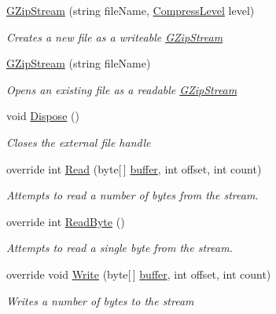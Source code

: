 \begin{DoxyCompactItemize}
\item 
\hyperlink{class_dot_z_lib_1_1_g_zip_stream_a12d73ef46491a5023b1fd620efb13f1a}{G\+Zip\+Stream} (string file\+Name, \hyperlink{namespace_dot_z_lib_a034f7a1ef9856d8834e6f6b1c53d8a4c}{Compress\+Level} level)
\begin{DoxyCompactList}\small\item\em Creates a new file as a writeable \hyperlink{class_dot_z_lib_1_1_g_zip_stream}{G\+Zip\+Stream} \end{DoxyCompactList}\item 
\hyperlink{class_dot_z_lib_1_1_g_zip_stream_aea152a18b8cab1ee3d614fc3799c7e08}{G\+Zip\+Stream} (string file\+Name)
\begin{DoxyCompactList}\small\item\em Opens an existing file as a readable \hyperlink{class_dot_z_lib_1_1_g_zip_stream}{G\+Zip\+Stream} \end{DoxyCompactList}\item 
void \hyperlink{class_dot_z_lib_1_1_g_zip_stream_a1fab7340250fa883c12ab08502826d07}{Dispose} ()
\begin{DoxyCompactList}\small\item\em Closes the external file handle \end{DoxyCompactList}\item 
override int \hyperlink{class_dot_z_lib_1_1_g_zip_stream_a7f08839f681ed2eec9e3a87a0f1b0b0b}{Read} (byte\mbox{[}$\,$\mbox{]} \hyperlink{structbuffer}{buffer}, int offset, int count)
\begin{DoxyCompactList}\small\item\em Attempts to read a number of bytes from the stream. \end{DoxyCompactList}\item 
override int \hyperlink{class_dot_z_lib_1_1_g_zip_stream_aedb91212e360ab574bca4745e2189201}{Read\+Byte} ()
\begin{DoxyCompactList}\small\item\em Attempts to read a single byte from the stream. \end{DoxyCompactList}\item 
override void \hyperlink{class_dot_z_lib_1_1_g_zip_stream_a844fcf0ab29c0bf26591e206669d485d}{Write} (byte\mbox{[}$\,$\mbox{]} \hyperlink{structbuffer}{buffer}, int offset, int count)
\begin{DoxyCompactList}\small\item\em Writes a number of bytes to the stream \end{DoxyCompactList}\item 

\end{DoxyCompactItemize}
